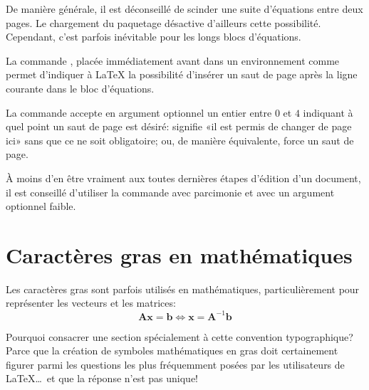 \begin{conseil}
  De manière générale, il est déconseillé de scinder une suite
  d'équations entre deux pages. Le chargement du paquetage
   désactive d'ailleurs cette possibilité. Cependant,
  c'est parfois inévitable pour les longs blocs d'équations.

  La commande \cmd{\displaybreak}, placée immédiatement avant {\bs\bs}
  dans un environnement comme  permet d'indiquer à {\LaTeX}
  la possibilité d'insérer un saut de page après la ligne courante
  dans le bloc d'équations.

  La commande accepte en argument optionnel un entier entre $0$ et $4$
  indiquant à quel point un saut de page est désiré:
  \cmdprint{\displaybreak[0]} signifie «il est permis de changer de
  page ici» sans que ce ne soit obligatoire;
  \cmdprint{\displaybreak[4]} ou, de manière équivalente,
  \cmdprint{\displaybreak} force un saut de page.

  À moins d'en être vraiment aux toutes dernières étapes d'édition
  d'un document, il est conseillé d'utiliser la commande
  \cmdprint{\displaybreak} avec parcimonie et avec un argument
  optionnel faible.
\end{conseil}


\section{Caractères gras en mathématiques}
\label{sec:math:gras}

Les caractères gras sont parfois utilisés en mathématiques,
particulièrement pour représenter les vecteurs et les matrices:
\begin{equation*}
  \symbf{A} \symbf{x} = \symbf{b} \Leftrightarrow
  \symbf{x} = \symbf{A}^{-1} \symbf{b}
\end{equation*}

Pourquoi consacrer une section spécialement à cette convention
typographique? Parce que la création de symboles mathématiques en
gras doit certainement figurer parmi les questions les plus
fréquemment posées par les utilisateurs de {\LaTeX}\dots\ et que la
réponse n'est pas unique!

